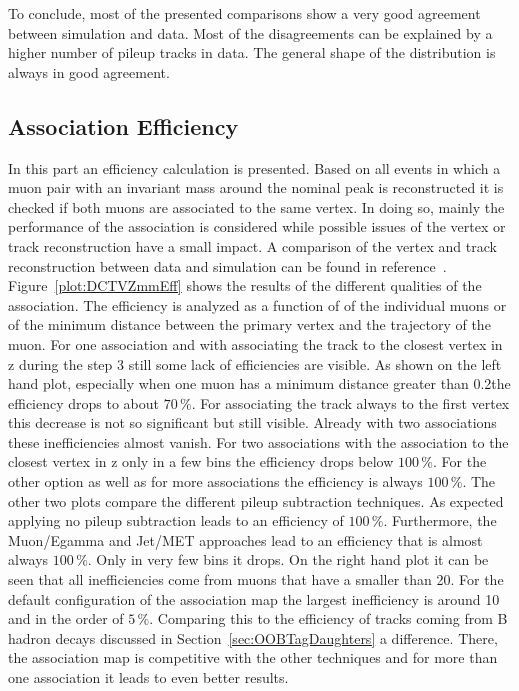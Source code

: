 To conclude, most of the presented comparisons show a very good agreement between simulation and data. Most of the disagreements can be explained by a higher number of pileup tracks in data. The general shape of the distribution is always in good agreement.

\subsection{Association Efficiency \label{sec:DCTVAE}}

In this part an efficiency calculation is presented. Based on all events in which a muon pair with an invariant mass around the nominal \Zz peak is reconstructed it is checked if both muons are associated to the same vertex. In doing so, mainly the performance of the association is considered while possible issues of the vertex or track reconstruction have a small impact. A comparison of the vertex and track reconstruction between data and simulation can be found in reference~. Figure~\ref{plot:DCTVZmmEff} shows the results of the different qualities of the association. The efficiency is analyzed as a function of \pt{} of the individual muons or of the minimum distance between the primary vertex and the trajectory of the muon.  For one association and with associating the track to the closest vertex in z during the step 3 still some lack of efficiencies are visible. As shown on the left hand plot, especially when one muon has a minimum distance greater than 0.2\mm the efficiency drops to about $70\,\%$. For associating the track always to the first vertex this decrease is not so significant but still visible. Already with two associations these inefficiencies almost vanish. For two associations with the association to the closest vertex in z only in a few bins the efficiency drops below $100\,\%$. For the other option as well as for more associations the efficiency is always $100\,\%$. The other two plots compare the different pileup subtraction techniques. As expected applying no pileup subtraction leads to an efficiency of $100\,\%$. Furthermore, the Muon/Egamma and Jet/MET approaches lead to an efficiency that is almost always $100\,\%$. Only in very few bins it drops. On the right hand plot it can be seen that all inefficiencies come from muons that have a \pt{} smaller than 20\GeV{}. For the default configuration of the association map the largest inefficiency is around 10\GeV{} and in the order of $5\,\%$. Comparing this to the efficiency of tracks coming from B hadron decays discussed in Section~\ref{sec:OOBTagDaughters} a difference. There, the association map is competitive with the other techniques and for more than one association it leads to even better results.

